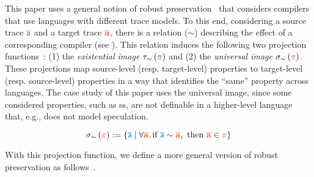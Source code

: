 This paper uses a general notion of robust preservation~\cite{abate2021extacc} that considers compilers that use languages with different trace models. 
To this end, considering a source trace $\src{\trace}$ and a target trace $\trg{\trace}$, there is a relation ($\sim$) describing the effect of a corresponding compiler (see ). 
This relation induces the following two projection functions~\cite{abate2021extacc}: (1) the \emph{existential image} $\tau_\sim\left(\src{\pi}\right)$ and (2) the \emph{universal image} $\sigma_\sim\left(\trg{\pi}\right)$.
These projections map source-level (resp. target-level) properties to target-level (resp. source-level) properties in a way that identifies the ``same'' property across languages. 
The case study of this paper uses the universal image, since some considered properties, such as \gls*{ss}, are not definable in a higher-level language that, e.g., does not model speculation.
% 
\begin{definition}
\label{def:universal:img}\label{def:sigma}
  \[ 
    \sigma_\sim\left(\trg{\pi}\right) := 
      \left\{ 
        \src{\trace} \mid \forall \trg{\trace}\ldotp \text{if }\src{\trace}\sim\trg{\trace}, \text{ then } \trg{\trace}\in\trg{\pi} 
      \right\}
  \]
\end{definition}
\noindent
With this projection function, we define a more general version of robust preservation as follows~\cite{abate2021extacc}.
% 
